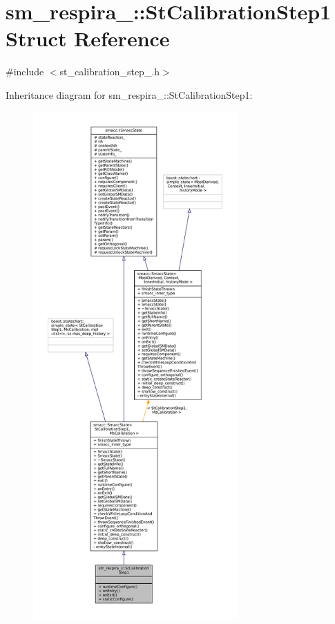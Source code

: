 \hypertarget{structsm__respira__1_1_1StCalibrationStep1}{}\section{sm\+\_\+respira\+\_\+:\+:St\+Calibration\+Step1 Struct Reference}
\label{structsm__respira__1_1_1StCalibrationStep1}


{\ttfamily \#include $<$st\+\_\+calibration\+\_\+step\+\_.\+h$>$}



Inheritance diagram for sm\+\_\+respira\+\_\+:\+:St\+Calibration\+Step1\+:
\nopagebreak
\begin{figure}[H]
\begin{center}
\leavevmode
\includegraphics[height=550pt]{structsm__respira__1_1_1StCalibrationStep1__inherit__graph}
\end{center}
\end{figure}


